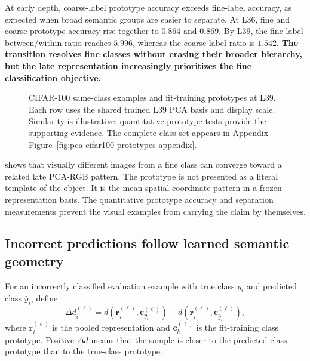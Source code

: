 

At early depth, coarse-label prototype accuracy exceeds fine-label accuracy,
as expected when broad semantic groups are easier to separate. At L36, fine
and coarse prototype accuracy rise together to $0.864$ and $0.869$. By L39,
the fine-label between/within ratio reaches $5.996$, whereas the coarse-label
ratio is $1.542$. \textbf{The transition resolves fine classes without erasing
their broader hierarchy, but the late representation increasingly prioritizes
the fine classification objective.}

\begin{figure}[!htbp]
    \centering
    \caption{CIFAR-100 same-class examples and fit-training prototypes at L39.
    Each row uses the shared trained L39 PCA basis and display scale. Similarity
    is illustrative; quantitative prototype tests provide the supporting
    evidence. The complete class set appears in
    \hyperref[fig:pca-cifar100-prototypes-appendix]{Appendix Figure~\ref*{fig:pca-cifar100-prototypes-appendix}}.}
    \label{fig:pca-cifar100-prototypes}
\end{figure}

 shows that visually different images from a
fine class can converge toward a related late PCA-RGB pattern. The prototype is
not presented as a literal template of the object. It is the mean spatial
coordinate pattern in a frozen representation basis. The quantitative
prototype accuracy and separation measurements prevent the visual examples
from carrying the claim by themselves.

\subsection{Incorrect predictions follow learned semantic geometry}

For an incorrectly classified evaluation example with true class $y_i$ and
predicted class $\hat y_i$, define
\begin{equation}
    \Delta d_i^{(\ell)}
    = d(\bm r_i^{(\ell)},\bm c_{y_i}^{(\ell)})
      -d(\bm r_i^{(\ell)},\bm c_{\hat y_i}^{(\ell)}),
    \label{eq:pca-error-margin}
\end{equation}
where $\bm r_i^{(\ell)}$ is the pooled representation and
$\bm c_k^{(\ell)}$ is the fit-training class prototype. Positive $\Delta d$
means that the sample is closer to the predicted-class prototype than to the
true-class prototype.

